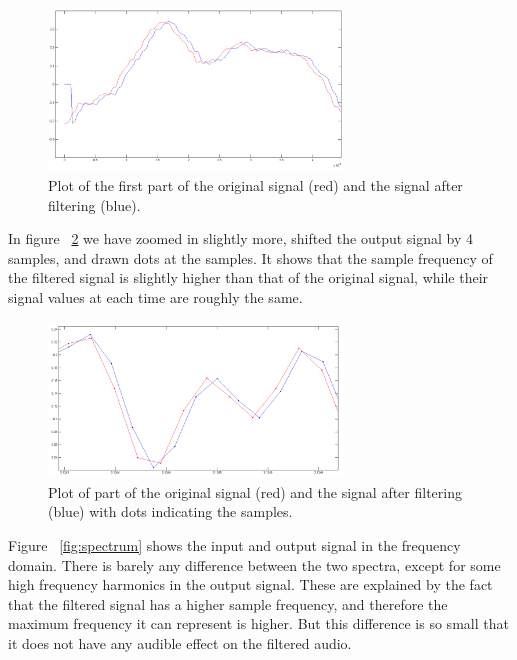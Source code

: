 \begin{figure}
\begin{center}
\includegraphics[width=0.7\textwidth]{images/samples3.png}
\caption{Plot of the first part of the original signal (red) and the signal after filtering (blue).}
\label{fig:plot1}
\end{center}
\end{figure}

In figure ~\ref{fig:plot2} we have zoomed in slightly more, shifted the output signal by 4 samples, and drawn dots at the samples. It shows that the sample frequency of the filtered signal is slightly higher than that of the original signal, while their signal values at each time are roughly the same.

\begin{figure}
\begin{center}
\includegraphics[width=0.7\textwidth]{images/samples.png}
\caption{Plot of part of the original signal (red) and the signal after filtering (blue) with dots indicating the samples.}
\label{fig:plot2}
\end{center}
\end{figure}

Figure ~\ref{fig:spectrum} shows the input and output signal in the frequency domain. There is barely any difference between the two spectra, except for some high frequency harmonics in the output signal. These are explained by the fact that the filtered signal has a higher sample frequency, and therefore the maximum frequency it can represent is higher. But this difference is so small that it does not have any audible effect on the filtered audio.

